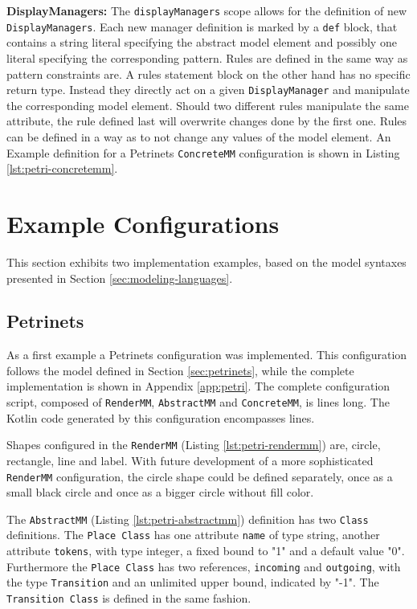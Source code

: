 \textbf{DisplayManagers:} The \texttt{displayManagers} scope allows for the definition of new \texttt{DisplayManagers}. Each new manager definition is marked by a \texttt{def} block, that contains a string literal specifying the abstract model element and possibly one literal specifying the corresponding pattern. 
Rules are defined in the same way as pattern constraints are. A rules statement block on the other hand has no specific return type. Instead they directly act on a given \texttt{DisplayManager} and manipulate the corresponding model element. Should two different rules manipulate the same attribute, the rule defined last will overwrite changes done by the first one. Rules can be defined in a way as to not change any values of the model element. An Example definition for a Petrinets \texttt{ConcreteMM} configuration is shown in Listing \ref{lst:petri-concretemm}.

\section{Example Configurations}
\label{sec:example-configs}
This section exhibits two implementation examples, based on the model syntaxes presented in Section \ref{sec:modeling-languages}.

\subsection{Petrinets}
\label{sec:petri-impl}
As a first example a Petrinets configuration was implemented. This configuration follows the model defined in Section \ref{sec:petrinets}, while the complete implementation is shown in Appendix \ref{app:petri}. The complete configuration script, composed of \texttt{RenderMM}, \texttt{AbstractMM} and \texttt{ConcreteMM}, is \petriConfigLoC lines long. The Kotlin code generated by this configuration encompasses \petriGeneratedLoC lines. 

Shapes configured in the \texttt{RenderMM} (Listing \ref{lst:petri-rendermm}) are, circle, rectangle, line and label. With future development of a more sophisticated \texttt{RenderMM} configuration, the circle shape could be defined separately, once as a small black circle and once as a bigger circle without fill color. 

The \texttt{AbstractMM} (Listing \ref{lst:petri-abstractmm}) definition has two \texttt{Class} definitions. The \texttt{Place Class} has one attribute \texttt{name} of type string, another attribute \texttt{tokens}, with type integer, a fixed bound to "1" and a default value "0". Furthermore the \texttt{Place Class} has two references, \texttt{incoming} and \texttt{outgoing}, with the type \texttt{Transition} and an unlimited upper bound, indicated by "-1". The \texttt{Transition Class} is defined in the same fashion.

